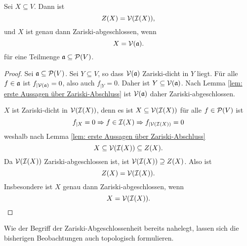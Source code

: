 \documentclass[a4paper,10pt]{article}
\begin{document}
\begin{lem}\label{lem: Charakterisierung durch Verschwindungsmengen}
 Sei $X \subseteq V$. Dann ist
 \[
  Z(X) = \mathcal{V}( \mathcal{I}(X) ),
 \]
 und  $X$ ist genau dann Zariski-abgeschlossen, wenn
 \[
  X = \mathcal{V}(\mathfrak{a}).
 \]
 für eine Teilmenge $\mathfrak{a} \subseteq \mathcal{P}(V)$.
\end{lem}
\begin{proof}
 Sei $\mathfrak{a} \subseteq \mathcal{P}(V)$. Sei $Y \subseteq V$, so dass $\mathcal{V}(\mathfrak{a})$ Zariski-dicht in $Y$ liegt. Für alle $f \in \mathfrak{a}$ ist $f_{|\mathcal{V}(\mathfrak{a})} = 0$, also auch $f_{|Y} = 0$. Daher ist $Y \subseteq \mathcal{V}(\mathfrak{a})$. Nach Lemma \ref{lem: erste Aussagen über Zariski-Abschluss} ist $\mathcal{V}(\mathfrak{a})$ daher Zariski-abgeschlossen.
 
 $X$ ist Zariski-dicht in $\mathcal{V}(\mathcal{I}(X))$, denn es ist $X \subseteq \mathcal{V}(\mathcal{I}(X))$ für alle $f \in \mathcal{P}(V)$ ist
 \[
  f_{|X} = 0 \Rightarrow f \in \mathcal{I}(X) \Rightarrow f_{|\mathcal{V}(\mathcal{I}(X))} = 0
 \]
 weshalb nach Lemma \ref{lem: erste Aussagen über Zariski-Abschluss}
 \[
  X \subseteq \mathcal{V}(\mathcal{I}(X)) \subseteq Z(X).
 \]
 Da $\mathcal{V}(\mathcal{I}(X))$ Zariski-abgeschlossen ist, ist $\mathcal{V}(\mathcal{I}(X)) \supseteq Z(X)$. Also ist
 \[
  Z(X) = \mathcal{V}(\mathcal{I}(X)).
 \]
 Insbesondere ist $X$ genau dann Zariski-abgeschlossen, wenn
 \[
  X = \mathcal{V}(\mathcal{I}(X)).
 \]
\end{proof}


Wie der Begriff der Zariski-Abgeschlossenheit bereits nahelegt, lassen sich die bisherigen Beobachtungen auch topologisch formulieren. 
\end{document}
